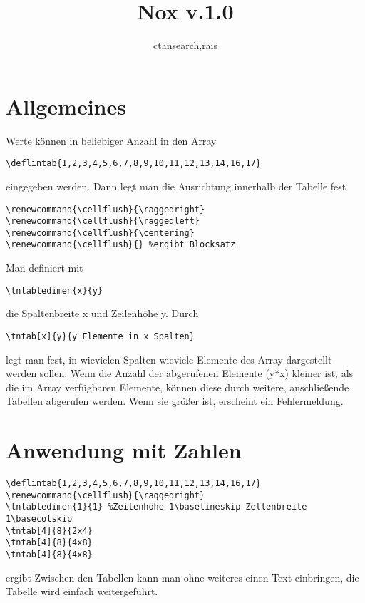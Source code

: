 \documentclass[10pt,a4paper]{article}%
\author{ctansearch,rais}
\title{Nox v.1.0}
\begin{document}
%
\maketitle
{}\par
\section{Allgemeines}
Werte können in beliebiger Anzahl in den Array \begin{verbatim}
\deflintab{1,2,3,4,5,6,7,8,9,10,11,12,13,14,16,17} \end{verbatim} eingegeben werden.
Dann legt man die Ausrichtung innerhalb der Tabelle fest
\begin{verbatim}
\renewcommand{\cellflush}{\raggedright}
\renewcommand{\cellflush}{\raggedleft}
\renewcommand{\cellflush}{\centering}
\renewcommand{\cellflush}{} %ergibt Blocksatz
\end{verbatim}
Man definiert mit \begin{verbatim}\tntabledimen{x}{y}\end{verbatim} die
Spaltenbreite x und Zeilenhöhe y. 
Durch \begin{verbatim}\tntab[x]{y}{y Elemente in x Spalten}\end{verbatim} legt man fest, in wievielen Spalten
wieviele Elemente des Array dargestellt werden sollen. Wenn die Anzahl der
abgerufenen Elemente (y*x) kleiner ist, als die im Array verfügbaren Elemente, können
diese durch weitere, anschließende Tabellen abgerufen werden. Wenn sie größer
ist, erscheint ein Fehlermeldung.

\section{Anwendung mit Zahlen}
\renewcommand{\cellflush}{}
\begin{verbatim}
\deflintab{1,2,3,4,5,6,7,8,9,10,11,12,13,14,16,17}
\renewcommand{\cellflush}{\raggedright}
\tntabledimen{1}{1} %Zeilenhöhe 1\baselineskip Zellenbreite 1\basecolskip
\tntab[4]{8}{2x4}
\tntab[4]{8}{4x8}
\tntab[4]{8}{4x8}
\end{verbatim} ergibt
Zwischen den Tabellen kann man ohne weiteres einen Text einbringen, die
Tabelle wird einfach weitergeführt.
\end{document}
